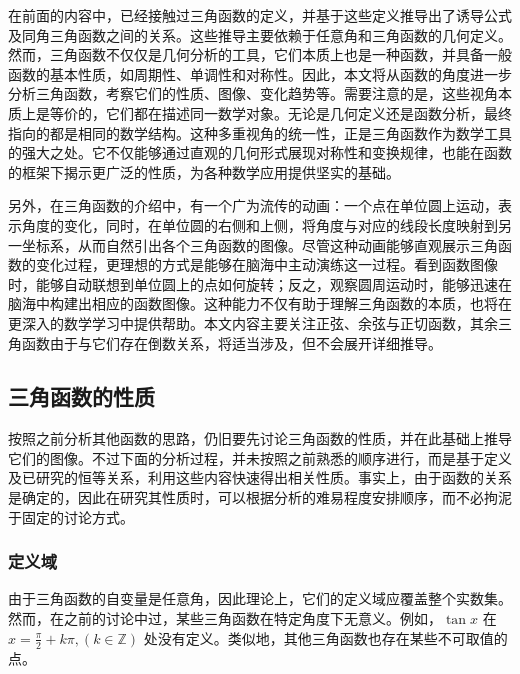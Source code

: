 
\begin{issues}
\issueDraft
\end{issues}


在前面的内容中，已经接触过三角函数的定义，并基于这些定义推导出了诱导公式及同角三角函数之间的关系。这些推导主要依赖于任意角和三角函数的几何定义。然而，三角函数不仅仅是几何分析的工具，它们本质上也是一种函数，并具备一般函数的基本性质，如周期性、单调性和对称性。因此，本文将从函数的角度进一步分析三角函数，考察它们的性质、图像、变化趋势等。需要注意的是，这些视角本质上是等价的，它们都在描述同一数学对象。无论是几何定义还是函数分析，最终指向的都是相同的数学结构。这种多重视角的统一性，正是三角函数作为数学工具的强大之处。它不仅能够通过直观的几何形式展现对称性和变换规律，也能在函数的框架下揭示更广泛的性质，为各种数学应用提供坚实的基础。

另外，在三角函数的介绍中，有一个广为流传的动画：一个点在单位圆上运动，表示角度的变化，同时，在单位圆的右侧和上侧，将角度与对应的线段长度映射到另一坐标系，从而自然引出各个三角函数的图像。尽管这种动画能够直观展示三角函数的变化过程，更理想的方式是能够在脑海中主动演练这一过程。看到函数图像时，能够自动联想到单位圆上的点如何旋转；反之，观察圆周运动时，能够迅速在脑海中构建出相应的函数图像。这种能力不仅有助于理解三角函数的本质，也将在更深入的数学学习中提供帮助。本文内容主要关注正弦、余弦与正切函数，其余三角函数由于与它们存在倒数关系，将适当涉及，但不会展开详细推导。

\subsection{三角函数的性质}

按照之前分析其他函数的思路，仍旧要先讨论三角函数的性质，并在此基础上推导它们的图像。不过下面的分析过程，并未按照之前熟悉的顺序进行，而是基于定义及已研究的恒等关系，利用这些内容快速得出相关性质。事实上，由于函数的关系是确定的，因此在研究其性质时，可以根据分析的难易程度安排顺序，而不必拘泥于固定的讨论方式。

\subsubsection{定义域}

由于三角函数的自变量是任意角，因此理论上，它们的定义域应覆盖整个实数集。然而，在之前的讨论中过，某些三角函数在特定角度下无意义。例如，$\tan x$ 在 $\displaystyle x=\frac{\pi}{2}+k\pi, (k\in\mathbb{Z})$ 处没有定义。类似地，其他三角函数也存在某些不可取值的点。


